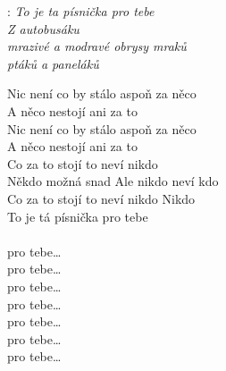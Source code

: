

\textregistered:
\emph{To je ta písnička pro tebe\\
Z  autobusáku\\
mrazivé a modravé obrysy mraků\\
ptáků a paneláků\\
}

\begin{Large}

Nic není co by stálo aspoň za něco\\
A něco nestojí ani za to\\
Nic není co by stálo aspoň za něco\\
A něco nestojí ani za to\\

Co za to stojí to neví nikdo\\
Někdo možná snad Ale nikdo neví kdo\\
Co za to stojí to neví nikdo Nikdo\\
To je tá písnička pro tebe\\

\textregistered{}\\

pro tebe…\\
pro tebe…\\
pro tebe…\\
pro tebe…\\
pro tebe…\\
pro tebe…\\
pro tebe…\\

\end{Large}

\newpage
